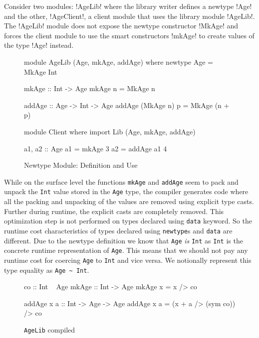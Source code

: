 \documentclass[manuscript,screen,nonacm]{acmart}
\begin{document}
Consider two modules: !AgeLib! where the library writer defines a newtype !Age! and the other, !AgeClient!, a client module that uses the library module !AgeLib!. The !AgeLib! module does not expose the newtype constructor !MkAge! and forces the client module to use the smart constructors !mkAge! to create values of the type !Age! instead.

\begin{figure}[ht]
  \centering
  \begin{minipage}[ht]{0.5\linewidth}
    \begin{code}
      module AgeLib (Age, mkAge, addAge) where
      newtype Age = MkAge Int

      mkAge :: Int -> Age
      mkAge n = MkAge n

      addAge :: Age -> Int -> Age
      addAge (MkAge n) p = MkAge (n + p)
    \end{code}
  \end{minipage}%
  \begin{minipage}[ht]{0.4\linewidth}
    \begin{code}
      module Client where
      import Lib (Age, mkAge, addAge)

      a1, a2 :: Age
      a1 = mkAge 3
      a2 = addAge a1 4


    \end{code}
  \end{minipage}
  \caption{Newtype Module: Definition and Use}
  \label{fig:newtype-modules}
\end{figure}
While on the surface level the functions \lstinline{mkAge} and \lstinline{addAge} seem to pack and unpack
the \lstinline{Int} value stored in the \lstinline{Age} type, the compiler generates code where all the packing and unpacking of the values are removed using explicit type casts. Further during runtime, the explicit casts are completely removed. This optimization step is not performed on types declared using \lstinline{data} keyword. So the runtime cost characteristics of types declared using  \lstinline{newtype}s and \lstinline{data} are different. Due to the newtype definition
we know that \lstinline{Age} \emph{is} \lstinline{Int} as \lstinline{Int} is the concrete runtime representation of \lstinline{Age}. This means that we should not pay any runtime cost for coercing \lstinline{Age} to \lstinline{Int} and vice versa. We notionally represent this type equality as \lstinline{Age ~ Int}.
\begin{figure}[ht]
  \centering
  \begin{minipage}[h]{0.4\linewidth}
    \begin{code}
      co :: Int ~ Age
      mkAge :: Int -> Age
      mkAge x = x /> co
    \end{code}
  \end{minipage}%
  \begin{minipage}[ht]{0.4\linewidth}
    \begin{code}
      addAge x a :: Int -> Age -> Age
      addAge x a = (x + a /> (sym co)) /> co
    \end{code}
  \end{minipage}
  \caption{\lstinline{AgeLib} compiled}
  \label{fig:compiled-code}
\end{figure}
\end{document}
